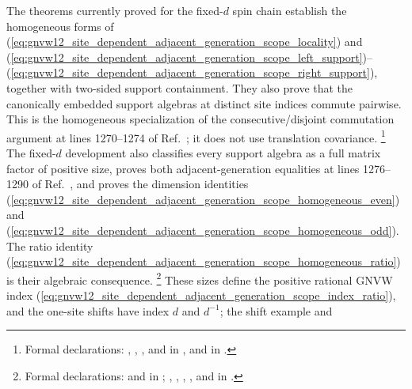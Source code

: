 \documentclass[11pt]{article}
\begin{document}
The theorems currently proved for the fixed-$d$ spin chain establish the
homogeneous forms of
(\ref{eq:gnvw12_site_dependent_adjacent_generation_scope_locality}) and
(\ref{eq:gnvw12_site_dependent_adjacent_generation_scope_left_support})--%
(\ref{eq:gnvw12_site_dependent_adjacent_generation_scope_right_support}),
together with two-sided support containment. They also prove that the
canonically embedded support algebras at distinct site indices commute
pairwise. This is the homogeneous specialization of the consecutive/disjoint
commutation argument at lines 1270--1274 of
Ref.~\cite{Gross2012IndexTheory}; it does not use translation covariance.%
\footnote{Formal declarations:
    ,
    ,
    , and
    in , and
    in .}
The fixed-$d$ development also classifies every support algebra as a full
matrix factor of positive size, proves both adjacent-generation equalities
at lines 1276--1290 of Ref.~\cite{Gross2012IndexTheory}, and proves the
dimension identities
(\ref{eq:gnvw12_site_dependent_adjacent_generation_scope_homogeneous_even})
and
(\ref{eq:gnvw12_site_dependent_adjacent_generation_scope_homogeneous_odd}).
The ratio identity
(\ref{eq:gnvw12_site_dependent_adjacent_generation_scope_homogeneous_ratio})
is their algebraic consequence.%
\footnote{Formal declarations:
     and
    in ;
    ,
    ,
    ,
    ,
    and
    in .}
These sizes define the positive rational GNVW index
(\ref{eq:gnvw12_site_dependent_adjacent_generation_scope_index_ratio}),
and the one-site shifts have index $d$ and $d^{-1}$; the shift example and
\end{document}

